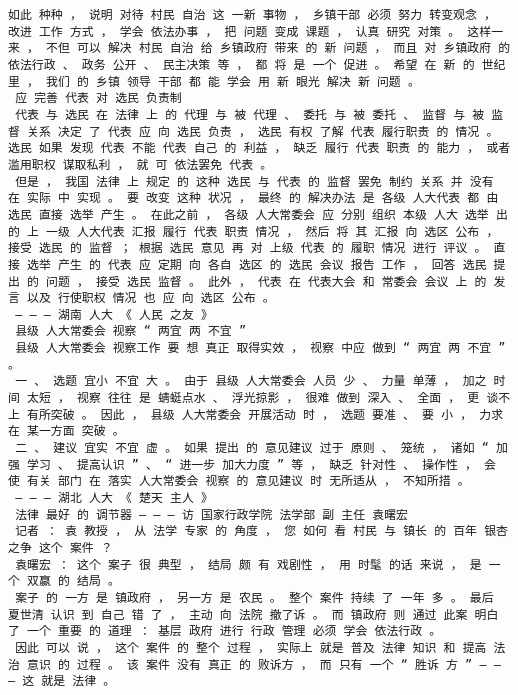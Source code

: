 \documentclass{article}
\begin{document}
\begin{Verbatim}[commandchars=\\\{\}]
 如此 种种 ， 说明 对待 村民 自治 这 一新 事物 ， 乡镇干部 必须 努力 转变观念 ， 改进 工作 方式 ， 学会 依法办事 ， 把 问题 变成 课题 ， 认真 研究 对策 。 这样一来 ， 不但 可以 解决 村民 自治 给 乡镇政府 带来 的 新 问题 ， 而且 对 乡镇政府 的 依法行政 、 政务 公开 、 民主决策 等 ， 都 将 是 一个 促进 。 希望 在 新 的 世纪 里 ， 我们 的 乡镇 领导 干部 都 能 学会 用 新 眼光 解决 新 问题 。 
 应 完善 代表 对 选民 负责制 
 代表 与 选民 在 法律 上 的 代理 与 被 代理 、 委托 与 被 委托 、 监督 与 被 监督 关系 决定 了 代表 应 向 选民 负责 ， 选民 有权 了解 代表 履行职责 的 情况 。 选民 如果 发现 代表 不能 代表 自己 的 利益 ， 缺乏 履行 代表 职责 的 能力 ， 或者 滥用职权 谋取私利 ， 就 可 依法罢免 代表 。 
 但是 ， 我国 法律 上 规定 的 这种 选民 与 代表 的 监督 罢免 制约 关系 并 没有 在 实际 中 实现 。 要 改变 这种 状况 ， 最终 的 解决办法 是 各级 人大代表 都 由 选民 直接 选举 产生 。 在此之前 ， 各级 人大常委会 应 分别 组织 本级 人大 选举 出 的 上 一级 人大代表 汇报 履行 代表 职责 情况 ， 然后 将 其 汇报 向 选区 公布 ， 接受 选民 的 监督 ； 根据 选民 意见 再 对 上级 代表 的 履职 情况 进行 评议 。 直接 选举 产生 的 代表 应 定期 向 各自 选区 的 选民 会议 报告 工作 ， 回答 选民 提出 的 问题 ， 接受 选民 监督 。 此外 ， 代表 在 代表大会 和 常委会 会议 上 的 发言 以及 行使职权 情况 也 应 向 选区 公布 。 
 — — — 湖南 人大 《 人民 之友 》 
 县级 人大常委会 视察 “ 两宜 两 不宜 ” 
 县级 人大常委会 视察工作 要 想 真正 取得实效 ， 视察 中应 做到 “ 两宜 两 不宜 ” 。 
 一 、 选题 宜小 不宜 大 。 由于 县级 人大常委会 人员 少 、 力量 单薄 ， 加之 时间 太短 ， 视察 往往 是 蜻蜓点水 、 浮光掠影 ， 很难 做到 深入 、 全面 ， 更 谈不上 有所突破 。 因此 ， 县级 人大常委会 开展活动 时 ， 选题 要准 、 要 小 ， 力求 在 某一方面 突破 。 
 二 、 建议 宜实 不宜 虚 。 如果 提出 的 意见建议 过于 原则 、 笼统 ， 诸如 “ 加强 学习 、 提高认识 ” 、 “ 进一步 加大力度 ” 等 ， 缺乏 针对性 、 操作性 ， 会 使 有关 部门 在 落实 人大常委会 视察 的 意见建议 时 无所适从 ， 不知所措 。 
 — — — 湖北 人大 《 楚天 主人 》 
 法律 最好 的 调节器 — — — 访 国家行政学院 法学部 副 主任 袁曙宏 
 记者 ： 袁 教授 ， 从 法学 专家 的 角度 ， 您 如何 看 村民 与 镇长 的 百年 银杏 之争 这个 案件 ？ 
 袁曙宏 ： 这个 案子 很 典型 ， 结局 颇 有 戏剧性 ， 用 时髦 的话 来说 ， 是 一个 双赢 的 结局 。 
 案子 的 一方 是 镇政府 ， 另一方 是 农民 。 整个 案件 持续 了 一年 多 。 最后 夏世清 认识 到 自己 错 了 ， 主动 向 法院 撤了诉 。 而 镇政府 则 通过 此案 明白 了 一个 重要 的 道理 ： 基层 政府 进行 行政 管理 必须 学会 依法行政 。 
 因此 可以 说 ， 这个 案件 的 整个 过程 ， 实际上 就是 普及 法律 知识 和 提高 法治 意识 的 过程 。 该 案件 没有 真正 的 败诉方 ， 而 只有 一个 “ 胜诉 方 ” — — — 这 就是 法律 。 

\end{Verbatim}
\end{document}

